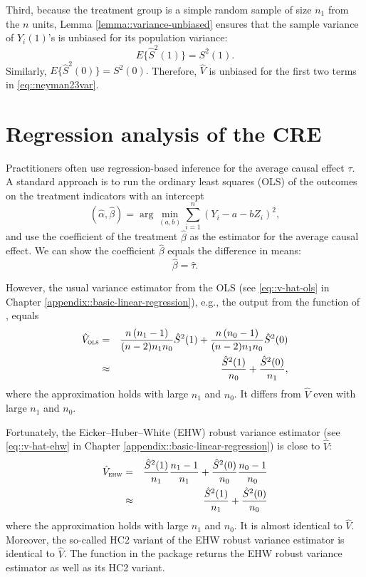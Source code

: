 Third, because the treatment group is a simple random sample of size $n_1$ from the $n$ units, Lemma \ref{lemma::variance-unbiased} ensures that the sample variance of $Y_i(1)$'s is unbiased for its population variance: 
$$
E\{  \hat{S}^2(1) \} = S^2(1).
$$
Similarly, $E\{  \hat{S}^2(0) \} = S^2(0).$ Therefore, $\hat{V} $ is unbiased for the first two terms in \eqref{eq::neyman23var}. 
 
 
 
 
 \section{Regression analysis of the CRE}
 
 
 
Practitioners often use regression-based inference for the average causal effect $\tau$. A standard approach is to run the ordinary least squares (OLS) of the outcomes on the treatment indicators with an intercept
$$
(\hat\alpha, \hat\beta) = \arg\min_{(a,b)} \sum_{i=1}^n (Y_i - a - bZ_i)^2,
$$
and use the coefficient of the treatment $ \hat\beta$ as the estimator for the average causal effect. 
We can show the coefficient $ \hat\beta$  equals the difference in means:
\begin{equation}
\label{eq::ols-difference-in-means}
\hat\beta = \hat\tau .
\end{equation}

However, the usual variance estimator from the OLS (see \eqref{eq::v-hat-ols} in Chapter \ref{appendix::basic-linear-regression}), e.g., the output from the  function of , equals
\begin{eqnarray}
\label{eq::ols-se}
\hat V_\textsc{ols} &=& \frac{n\left(n_1 -1\right)}{( n-2 ) n_1  n_0 } \hat S^2(1) +\frac{n\left(n_0 -1\right)}{( n-2 ) n_1  n_0 } \hat S^2(0)\\
\nonumber &\approx& \frac{\hat S^2(1)}{n_0 }+\frac{ \hat S^2(0) }{n_1 },
\end{eqnarray}
where the approximation holds with large $ n_1 $ and $ n_0 $. It differs from $\hat{V}$ even with large $ n_1 $ and $ n_0 $. 


Fortunately, the Eicker--Huber--White (EHW) robust variance estimator (see \eqref{eq::v-hat-ehw} in Chapter \ref{appendix::basic-linear-regression}) is close to $\hat{V}$:
 \begin{eqnarray}
\label{eq::ols-ehw}
\hat V_\textsc{ehw} &=& \frac{\hat S^2(1)}{n_1 } \frac{n_1 -1}{n_1 }+\frac{\hat S^2(0)}{n_0 } \frac{n_0 -1}{n_0 } \\
\nonumber &\approx& \frac{ \hat S^2(1)  }{n_1 }+\frac{ \hat S^2(0) }{n_0 }
\end{eqnarray}
where the approximation holds with large $ n_1 $ and $ n_0 $. It is almost identical to $\hat{V}$. Moreover, the so-called HC2 variant of the EHW robust variance estimator is identical to  $\hat{V}$. The  function in the  package returns the EHW robust variance estimator as well as its HC2 variant. 

